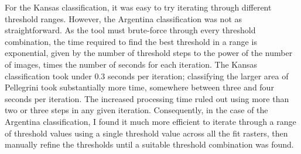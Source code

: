 For the Kansas classification, it was easy to try iterating through different threshold ranges. However, the Argentina classification was not as straightforward. As the tool must brute-force through every threshold combination, the time required to find the best threshold in a range is exponential, given by the number of threshold steps to the power of the number of images, times the number of seconds for each iteration. The Kansas classification took under 0.3 seconds per iteration; classifying the larger area of Pellegrini took substantially more time, somewhere between three and four seconds per iteration. The increased processing time ruled out using more than two or three steps in any given iteration. Consequently, in the case of the Argentina classification, I found it much more efficient to iterate through a range of threshold values using a single threshold value across all the fit rasters, then manually refine the thresholds until a suitable threshold combination was found.